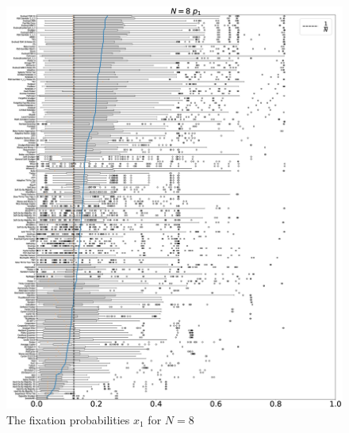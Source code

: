 \documentclass[10pt,letterpaper]{article}
\begin{document}
\begin{figure}[!hbtp]
    \centering
    \includegraphics[draft, width=\textwidth]{./Fig18.eps}
    \caption{The fixation probabilities \(x_1\) for \(N=8\)}
\end{figure}
\end{document}
